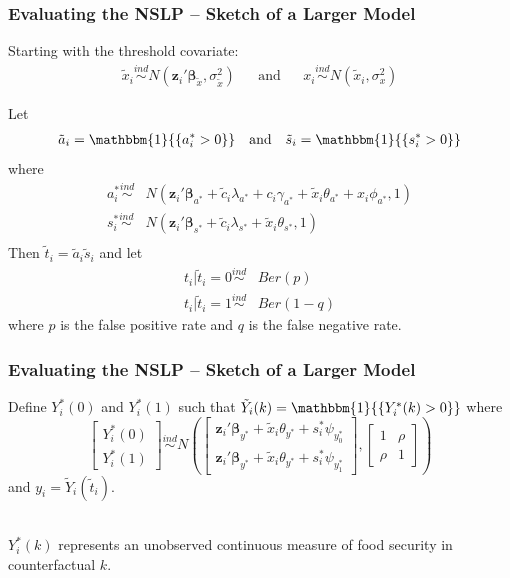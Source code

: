 \documentclass[xcolor=dvipsnames]{beamer}
\newcommand{\indicator}[1]{\mathbbm{1}{\left\{ {#1} \right\} }}
\begin{document}
\begin{frame}
\frametitle{Evaluating the NSLP -- Sketch of a Larger Model}
Starting with the threshold covariate:
\begin{align*}
\tilde{x}_i\stackrel{ind}{\sim} N(\bm{z}_i'\bm{\beta}_{\tilde{x}},\sigma_{\tilde{x}}^2)&&\mbox{and}&&x_i\stackrel{ind}{\sim} N(\tilde{x}_i,\sigma_{x}^2)
\end{align*}

\pause Let
\begin{align*}
\tilde{a}_i=\indicator{a^*_i>0} &&\mbox{and}&&\tilde{s}_i=\indicator{s^*_i>0}
\end{align*}
where
\begin{align*}
a_i^*\stackrel{ind}{\sim} & N(\bm{z}_i'\bm{\beta}_{a^*} +
\tilde{c}_i\lambda_{a^*} + c_i\gamma_{a^*} + \tilde{x}_i\theta_{a^*} +
x_i\phi_{a^*}, 1)\\
s_i^*\stackrel{ind}{\sim} & N(\bm{z}_i'\bm{\beta}_{s^*} +
\tilde{c}_i\lambda_{s^*} + \tilde{x}_i\theta_{s^*} , 1)\\
\end{align*}
Then $\tilde{t}_i=\tilde{a}_i\tilde{s}_i$ \pause and let
\begin{align*}
t_i | \tilde{t}_i=0 \stackrel{ind}{\sim} & Ber(p)\\
t_i | \tilde{t}_i=1 \stackrel{ind}{\sim} & Ber(1-q)
\end{align*}
where $p$ is the false positive rate and $q$ is the false negative
rate. 
\end{frame}

\begin{frame}
\frametitle{Evaluating the NSLP -- Sketch of a Larger Model}
Define $Y^*_i(0)$ and $Y^*_i(1)$ such that $\tilde{Y}_i(k)=\indicator{Y^*_i(k)>0}$ where 
\[
\begin{bmatrix} Y_i^*(0) \\ Y_i^*(1) \end{bmatrix}
\stackrel{ind}{\sim} N \left( \begin{bmatrix}
    \bm{z}_i'\bm{\beta}_{y^*} + \tilde{x}_i\theta_{y^*} +
    s^*_i\psi_{y_0^*} \\
    \bm{z}_i'\bm{\beta}_{y^*} + \tilde{x}_i\theta_{y^*} +
    s^*_i\psi_{y_1^*} \end{bmatrix},
\begin{bmatrix}1 & \rho \\ \rho & 1 \end{bmatrix} \right)
\]
and $y_i=\tilde{Y}_i(\tilde{t}_i)$.\\~

$Y_i^*(k)$ represents an unobserved continuous measure of food security in counterfactual $k$.

\end{frame}
\end{document}
